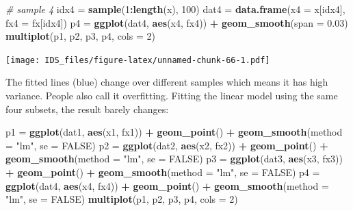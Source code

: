 \documentclass[12pt,]{krantz}
\makeatletter
\newenvironment{Shaded}{\begin{snugshade}}{\end{snugshade}}
\newcommand{\CommentTok}[1]{\textcolor[rgb]{0.37,0.37,0.37}{\textit{#1}}}
\newcommand{\DataTypeTok}[1]{\textcolor[rgb]{0.27,0.27,0.27}{#1}}
\newcommand{\DecValTok}[1]{\textcolor[rgb]{0.06,0.06,0.06}{#1}}
\newcommand{\FloatTok}[1]{\textcolor[rgb]{0.06,0.06,0.06}{#1}}
\newcommand{\KeywordTok}[1]{\textcolor[rgb]{0.27,0.27,0.27}{\textbf{#1}}}
\newcommand{\NormalTok}[1]{#1}
\newcommand{\OperatorTok}[1]{\textcolor[rgb]{0.43,0.43,0.43}{\textbf{#1}}}
\newcommand{\OtherTok}[1]{\textcolor[rgb]{0.37,0.37,0.37}{#1}}
\newcommand{\StringTok}[1]{\textcolor[rgb]{0.5,0.5,0.5}{#1}}
\newenvironment{kframe}{%
\medskip{}
\setlength{\fboxsep}{.8em}
 \def\at@end@of@kframe{}%
 \ifinner\ifhmode%
  \def\at@end@of@kframe{\end{minipage}}%
  \begin{minipage}{\columnwidth}%
 \fi\fi%
 \def\FrameCommand##1{\hskip\@totalleftmargin \hskip-\fboxsep
 \colorbox{shadecolor}{##1}\hskip-\fboxsep
     \hskip-\linewidth \hskip-\@totalleftmargin \hskip\columnwidth}%
 \MakeFramed {\advance\hsize-\width
   \@totalleftmargin\z@ \linewidth\hsize
   \@setminipage}}%
 {\par\unskip\endMakeFramed%
 \at@end@of@kframe}
\renewenvironment{Shaded}{\begin{kframe}}{\end{kframe}}
\makeatother
\begin{document}
\begin{Shaded}
\begin{Highlighting}[]
\CommentTok{# sample 4}
\NormalTok{idx4 =}\StringTok{ }\KeywordTok{sample}\NormalTok{(}\DecValTok{1}\OperatorTok{:}\KeywordTok{length}\NormalTok{(x), }\DecValTok{100}\NormalTok{)}
\NormalTok{dat4 =}\StringTok{ }\KeywordTok{data.frame}\NormalTok{(}\DataTypeTok{x4 =}\NormalTok{ x[idx4], }\DataTypeTok{fx4 =}\NormalTok{ fx[idx4])}
\NormalTok{p4 =}\StringTok{ }\KeywordTok{ggplot}\NormalTok{(dat4, }\KeywordTok{aes}\NormalTok{(x4, fx4)) }\OperatorTok{+}\StringTok{ }\KeywordTok{geom_smooth}\NormalTok{(}\DataTypeTok{span =} \FloatTok{0.03}\NormalTok{)}
\KeywordTok{multiplot}\NormalTok{(p1, p2, p3, p4, }\DataTypeTok{cols =} \DecValTok{2}\NormalTok{)}
\end{Highlighting}
\end{Shaded}

\texttt{[image: IDS\_files/figure-latex/unnamed-chunk-66-1.pdf]}

The fitted lines (blue) change over different samples which means it has high variance. People also call it overfitting. Fitting the linear model using the same four subsets, the result barely changes:

\begin{Shaded}
\begin{Highlighting}[]
\NormalTok{p1 =}\StringTok{ }\KeywordTok{ggplot}\NormalTok{(dat1, }\KeywordTok{aes}\NormalTok{(x1, fx1)) }\OperatorTok{+}\StringTok{ }\KeywordTok{geom_point}\NormalTok{() }\OperatorTok{+}\StringTok{ }\KeywordTok{geom_smooth}\NormalTok{(}\DataTypeTok{method =} \StringTok{"lm"}\NormalTok{, }
    \DataTypeTok{se =} \OtherTok{FALSE}\NormalTok{)}
\NormalTok{p2 =}\StringTok{ }\KeywordTok{ggplot}\NormalTok{(dat2, }\KeywordTok{aes}\NormalTok{(x2, fx2)) }\OperatorTok{+}\StringTok{ }\KeywordTok{geom_point}\NormalTok{() }\OperatorTok{+}\StringTok{ }\KeywordTok{geom_smooth}\NormalTok{(}\DataTypeTok{method =} \StringTok{"lm"}\NormalTok{, }
    \DataTypeTok{se =} \OtherTok{FALSE}\NormalTok{)}
\NormalTok{p3 =}\StringTok{ }\KeywordTok{ggplot}\NormalTok{(dat3, }\KeywordTok{aes}\NormalTok{(x3, fx3)) }\OperatorTok{+}\StringTok{ }\KeywordTok{geom_point}\NormalTok{() }\OperatorTok{+}\StringTok{ }\KeywordTok{geom_smooth}\NormalTok{(}\DataTypeTok{method =} \StringTok{"lm"}\NormalTok{, }
    \DataTypeTok{se =} \OtherTok{FALSE}\NormalTok{)}
\NormalTok{p4 =}\StringTok{ }\KeywordTok{ggplot}\NormalTok{(dat4, }\KeywordTok{aes}\NormalTok{(x4, fx4)) }\OperatorTok{+}\StringTok{ }\KeywordTok{geom_point}\NormalTok{() }\OperatorTok{+}\StringTok{ }\KeywordTok{geom_smooth}\NormalTok{(}\DataTypeTok{method =} \StringTok{"lm"}\NormalTok{, }
    \DataTypeTok{se =} \OtherTok{FALSE}\NormalTok{)}
\KeywordTok{multiplot}\NormalTok{(p1, p2, p3, p4, }\DataTypeTok{cols =} \DecValTok{2}\NormalTok{)}
\end{Highlighting}
\end{Shaded}
\end{document}
